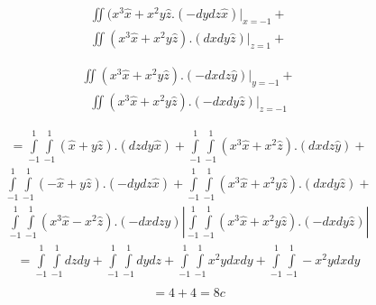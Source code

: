 \begin{exmp}
	\begin{align*}
			\iint\limits(x^3 \hat{x}+ x^2y\hat{z}.(-dydz\hat{x})|_{x=-1}+
		\end{align*}
	\begin{align*}
			\iint\limits(x^3 \hat{x}+ x^2y\hat{z}).(dxdy \hat{z})|_{z=1}+
		\end{align*}
	
	\begin{align*}
			\iint\limits(x^3 \hat{x}+ x^2y\hat{z}).(-dxdz\hat{y})|_{y=-1}+
		\end{align*}
	\begin{align*}
			\iint\limits(x^3 \hat{x}+ x^2y\hat{z}).(-dxdy\hat{z})|_{z=-1} 
		\end{align*}
	
	\begin{align*}
			={\int\limits_{-1}^{1}\int\limits_{-1}^{1}}(\hat{x}+y\hat{z}).(dzdy\hat{x})+{\int\limits_{-1}^{1}\int\limits_{-1}^{1}}(x^3 \hat{x}+ x^2\hat{z}).(dxdz\hat{y})+
		\end{align*}
	\begin{align*}
			{\int\limits_{-1}^{1}\int\limits_{-1}^{1}}( -\hat{x}+ y\hat{z}).(-dydz\hat{x})+
			{\int\limits_{-1}^{1}\int\limits_{-1}^{1}}(x^3 \hat{x}+ x^2y\hat{z}).(dxdy \hat{z})+
		\end{align*}
	\begin{align*}
			{\int\limits_{-1}^{1}\int\limits_{-1}^{1}}(x^3 \hat{x}- x^2\hat{z}).(-dxdz\hat{y})|
			{\int\limits_{-1}^{1}\int\limits_{-1}^{1}}(x^3 \hat{x}+ x^2y\hat{z}).(-dxdy\hat{z})|
		\end{align*}
	\begin{align*}
			={\int\limits_{-1}^{1}\int\limits_{-1}^{1}}dzdy + {\int\limits_{-1}^{1}\int\limits_{-1}^{1}}dydz +
			{\int\limits_{-1}^{1}\int\limits_{-1}^{1}}x^2ydxdy +
			{\int\limits_{-1}^{1}\int\limits_{-1}^{1}}-x^2ydxdy\\
		\end{align*}
	\begin{align*}
			=4+4 = 8c
		\end{align*}
	
	
	

\end{exmp}
